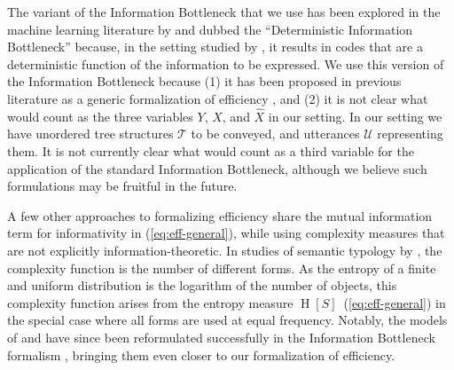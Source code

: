 \documentclass[10pt,twoside,lineno]{article}
\begin{document}
The variant of the Information Bottleneck that we use has been explored in the machine learning literature by \citet{strouse2017deterministic} and dubbed the ``Deterministic Information Bottleneck'' because, in the setting studied by \citet{strouse2017deterministic}, it results in codes that are a deterministic function of the information to be expressed.
We use this version of the Information Bottleneck because (1) it has been proposed in previous literature as a generic formalization of efficiency \citep{ferreri2003least}, and (2) it is not clear what would count as the three variables $Y$, $X$, and $\hat{X}$ in our setting. In our setting we have unordered tree structures $\mathcal{T}$ to be conveyed, and utterances $\mathcal{U}$ representing them. It is not currently clear what would count as a third variable for the application of the standard Information Bottleneck, although we believe such formulations may be fruitful in the future.


A few other approaches to formalizing efficiency share the mutual information term for informativity in (\ref{eq:eff-general}), while using complexity measures that are not explicitly information-theoretic.
In studies of semantic typology by \citet{regier2007color, xu2014numeral, xu2016historical}, the complexity function is the number of different forms.
As the entropy of a finite and uniform distribution is the logarithm of the number of objects, this complexity function arises from the entropy measure $\operatorname{H}[S]$~(\ref{eq:eff-general}) in the special case where all forms are used at equal frequency.
Notably, the models of \citet{regier2007color} and \citet{xu2016historical} have since been reformulated successfully in the Information Bottleneck formalism \cite{zaslavsky2018efficient, zaslavsky2019semantic}, bringing them even closer to our formalization of efficiency.
\end{document}
